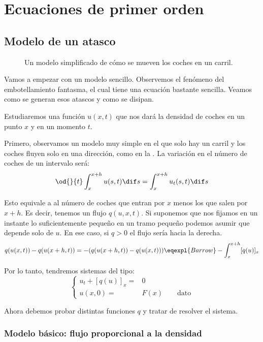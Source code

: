 \chapter{Ecuaciones de primer orden}

\section{Modelo de un atasco}

	\begin{figure}[thbp]
	\centering
	\caption{Un modelo simplificado de cómo se mueven los coches en un carril.}
	\label{fig:CochesCarril}
	\end{figure}

	Vamos a empezar con un modelo sencillo. Observemos el fenómeno del embotellamiento fantasma, el cual tiene una ecuación bastante sencilla. Veamos como se generan esos atascos y como se disipan.

	Estudiaremos una función $u(x,t)$ que nos dará la densidad de coches en un punto $x$ y en un momento $t$.

	Primero, observamos un modelo muy simple en el que solo hay un carril y los coches fluyen solo en una dirección, como en la . La variación en el número de coches de un intervalo será:
	\[ \od{}{t} \int^{x+h}_{x} u(s,t) \dif s = \int^{x+h}_{x} u_t(s,t) \dif s \]

	Esto equivale a al número de coches que entran por $x$ menos los que salen por $x + h$. Es decir, tenemos un flujo $q(u, x, t)$. Si suponemos que nos fijamos en un instante lo suficientemente pequeño en un tramo pequeño podemos asumir que depende solo de $u$. En ese caso, si $q > 0$ el flujo sería hacia la derecha.
	\[ q(u(x,t)) - q(u(x+h,t)) = -( q(u(x+h,t)) -  q(u(x,t)) ) \eqexpl{Barrow} -\int^{x+h}_{x} [q(u)]_{x}
	\]

	Por lo tanto, tendremos sistemas del tipo:
	\begin{equation}
	\left\{
	\begin{array}{rl}
	u_t + [q(u)]_{x} =&\!\!\! 0 \\
	u(x, 0) =&\!\!\! F(x) \quad \quad \text{dato}
	\end{array}
	\right. \label{eq:ModeloAtasco}
	\end{equation}

	Ahora debemos probar distintas funciones $q$ y tratar de resolver el sistema.

	\subsection{Modelo básico: flujo proporcional a la densidad}

